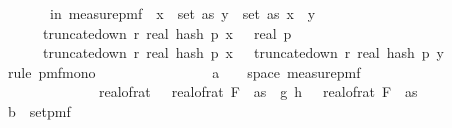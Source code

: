 \begin{isabellebody}
\ \ \ \ \ \ {\isasymP}{\isacharparenleft}{\kern0pt}{\isasymomega}\ in\ measure{\isacharunderscore}{\kern0pt}pmf\ {\isasymOmega}\ {\isasymexists}x\ {\isasymin}\ set\ as{\isachardot}{\kern0pt}\ {\isasymexists}y\ {\isasymin}\ set\ as{\isachardot}{\kern0pt}\ x\ {\isasymnoteq}\ y\ {\isasymand}\ \isanewline
\ \ \ \ \ \ truncate{\isacharunderscore}{\kern0pt}down\ r\ {\isacharparenleft}{\kern0pt}real\ {\isacharparenleft}{\kern0pt}hash\ p\ x\ {\isasymomega}{\isacharparenright}{\kern0pt}{\isacharparenright}{\kern0pt}\ {\isasymle}\ real\ p\ {\isasymand}\ \isanewline
\ \ \ \ \ \ truncate{\isacharunderscore}{\kern0pt}down\ r\ {\isacharparenleft}{\kern0pt}real\ {\isacharparenleft}{\kern0pt}hash\ p\ x\ {\isasymomega}{\isacharparenright}{\kern0pt}{\isacharparenright}{\kern0pt}\ {\isacharequal}{\kern0pt}\ truncate{\isacharunderscore}{\kern0pt}down\ r\ {\isacharparenleft}{\kern0pt}real\ {\isacharparenleft}{\kern0pt}hash\ p\ y\ {\isasymomega}{\isacharparenright}{\kern0pt}{\isacharparenright}{\kern0pt}{\isacharparenright}{\kern0pt}{\isachardoublequoteclose}\ \isanewline
\ \ \ \ \isamarkupfalse%
\ {\isacharparenleft}{\kern0pt}rule\ pmf{\isacharunderscore}{\kern0pt}mono{\isacharunderscore}{\kern0pt}{}{\isacharparenright}{\kern0pt}\isanewline
\ \ \ \ \ \ \isamarkupfalse%
\ {\isasymomega}\isanewline
\ \ \ \ \ \ \isamarkupfalse%
\ a{\isacharcolon}{\kern0pt}{\isachardoublequoteopen}{\isasymomega}\ {\isasymin}\ {\isacharbraceleft}{\kern0pt}{\isasymomega}\ {\isasymin}\ space\ {\isacharparenleft}{\kern0pt}measure{\isacharunderscore}{\kern0pt}pmf\ {\isasymOmega}\isanewline
\ \ \ \ \ \ \ \ \ \ \ \ \ \ real{\isacharunderscore}{\kern0pt}of{\isacharunderscore}{\kern0pt}rat\ {\isasymdelta}\ {\isacharasterisk}{\kern0pt}\ real{\isacharunderscore}{\kern0pt}of{\isacharunderscore}{\kern0pt}rat\ {\isacharparenleft}{\kern0pt}F\ {}\ as{\isacharparenright}{\kern0pt}\ {\isacharless}{\kern0pt}\ {\isasymbar}g{\isacharprime}{\kern0pt}\ {\isacharparenleft}{\kern0pt}h\ {\isasymomega}{\isacharparenright}{\kern0pt}\ {\isacharminus}{\kern0pt}\ real{\isacharunderscore}{\kern0pt}of{\isacharunderscore}{\kern0pt}rat\ {\isacharparenleft}{\kern0pt}F\ {}\ as{\isacharparenright}{\kern0pt}{\isasymbar}{\isacharbraceright}{\kern0pt}{\isachardoublequoteclose}\isanewline
\ \ \ \ \ \ \isamarkupfalse%
\ b{\isacharcolon}{\kern0pt}{\isachardoublequoteopen}{\isasymomega}\ {\isasymin}\ set{\isacharunderscore}{\kern0pt}pmf\ {\isasymOmega}\ \isanewline

\end{isabellebody}
